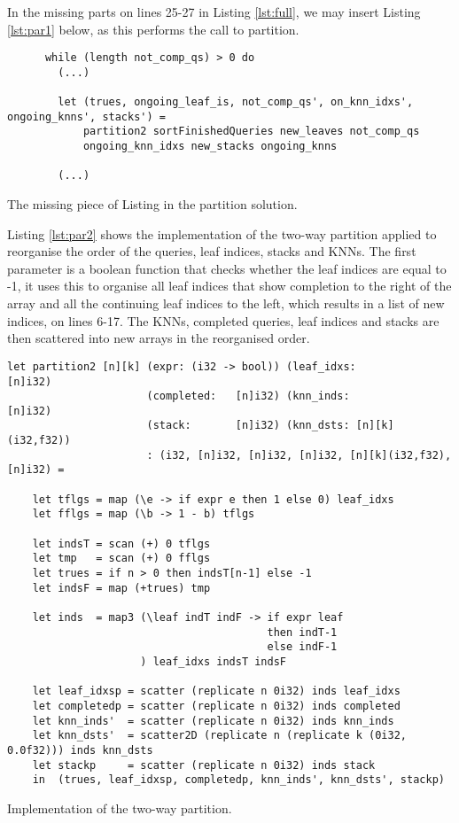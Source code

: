 In the missing parts on lines 25-27 in Listing \ref{lst:full}, we may insert Listing \ref{lst:par1} below, as this performs the call to partition. 

\begin{listing}[H]
\begin{verbatim}
      while (length not_comp_qs) > 0 do
        (...)

        let (trues, ongoing_leaf_is, not_comp_qs', on_knn_idxs', ongoing_knns', stacks') =
            partition2 sortFinishedQueries new_leaves not_comp_qs
            ongoing_knn_idxs new_stacks ongoing_knns

        (...)
\end{verbatim}
\caption{The missing piece of Listing \protect{\ref{lst:full}} in the partition solution.}
\label{lst:par1}
\end{listing}

Listing \ref{lst:par2} shows the implementation of the two-way partition applied to reorganise the order of the queries, leaf indices, stacks and KNNs. The first parameter is a boolean function that checks whether the leaf indices are equal to -1, it uses this to organise all leaf indices that show completion to the right of the array and all the continuing leaf indices to the left, which results in a list of new indices, on lines 6-17. The KNNs, completed queries, leaf indices and stacks are then scattered into new arrays in the reorganised order. 

\begin{listing}[H]
\begin{verbatim}
let partition2 [n][k] (expr: (i32 -> bool)) (leaf_idxs:         [n]i32)
                      (completed:   [n]i32) (knn_inds:          [n]i32)
                      (stack:       [n]i32) (knn_dsts: [n][k](i32,f32))
                      : (i32, [n]i32, [n]i32, [n]i32, [n][k](i32,f32), [n]i32) =

    let tflgs = map (\e -> if expr e then 1 else 0) leaf_idxs
    let fflgs = map (\b -> 1 - b) tflgs

    let indsT = scan (+) 0 tflgs
    let tmp   = scan (+) 0 fflgs
    let trues = if n > 0 then indsT[n-1] else -1
    let indsF = map (+trues) tmp

    let inds  = map3 (\leaf indT indF -> if expr leaf 
                                         then indT-1 
                                         else indF-1
                     ) leaf_idxs indsT indsF

    let leaf_idxsp = scatter (replicate n 0i32) inds leaf_idxs
    let completedp = scatter (replicate n 0i32) inds completed
    let knn_inds'  = scatter (replicate n 0i32) inds knn_inds
    let knn_dsts'  = scatter2D (replicate n (replicate k (0i32, 0.0f32))) inds knn_dsts 
    let stackp     = scatter (replicate n 0i32) inds stack
    in  (trues, leaf_idxsp, completedp, knn_inds', knn_dsts', stackp)
\end{verbatim}
\caption{Implementation of the two-way partition.}
\label{lst:par2}
\end{listing}

